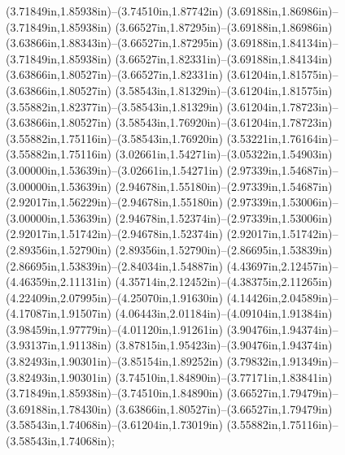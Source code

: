 (3.71849in,1.85938in)--(3.74510in,1.87742in) (3.69188in,1.86986in)--(3.71849in,1.85938in) (3.66527in,1.87295in)--(3.69188in,1.86986in) (3.63866in,1.88343in)--(3.66527in,1.87295in) (3.69188in,1.84134in)--(3.71849in,1.85938in) (3.66527in,1.82331in)--(3.69188in,1.84134in) (3.63866in,1.80527in)--(3.66527in,1.82331in) (3.61204in,1.81575in)--(3.63866in,1.80527in) (3.58543in,1.81329in)--(3.61204in,1.81575in) (3.55882in,1.82377in)--(3.58543in,1.81329in) (3.61204in,1.78723in)--(3.63866in,1.80527in) (3.58543in,1.76920in)--(3.61204in,1.78723in) (3.55882in,1.75116in)--(3.58543in,1.76920in) (3.53221in,1.76164in)--(3.55882in,1.75116in) (3.02661in,1.54271in)--(3.05322in,1.54903in) (3.00000in,1.53639in)--(3.02661in,1.54271in) (2.97339in,1.54687in)--(3.00000in,1.53639in) (2.94678in,1.55180in)--(2.97339in,1.54687in) (2.92017in,1.56229in)--(2.94678in,1.55180in) (2.97339in,1.53006in)--(3.00000in,1.53639in) (2.94678in,1.52374in)--(2.97339in,1.53006in) (2.92017in,1.51742in)--(2.94678in,1.52374in) (2.92017in,1.51742in)--(2.89356in,1.52790in) (2.89356in,1.52790in)--(2.86695in,1.53839in) (2.86695in,1.53839in)--(2.84034in,1.54887in) (4.43697in,2.12457in)--(4.46359in,2.11131in) (4.35714in,2.12452in)--(4.38375in,2.11265in) (4.22409in,2.07995in)--(4.25070in,1.91630in) (4.14426in,2.04589in)--(4.17087in,1.91507in) (4.06443in,2.01184in)--(4.09104in,1.91384in) (3.98459in,1.97779in)--(4.01120in,1.91261in) (3.90476in,1.94374in)--(3.93137in,1.91138in) (3.87815in,1.95423in)--(3.90476in,1.94374in) (3.82493in,1.90301in)--(3.85154in,1.89252in) (3.79832in,1.91349in)--(3.82493in,1.90301in) (3.74510in,1.84890in)--(3.77171in,1.83841in) (3.71849in,1.85938in)--(3.74510in,1.84890in) (3.66527in,1.79479in)--(3.69188in,1.78430in) (3.63866in,1.80527in)--(3.66527in,1.79479in) (3.58543in,1.74068in)--(3.61204in,1.73019in) (3.55882in,1.75116in)--(3.58543in,1.74068in);
